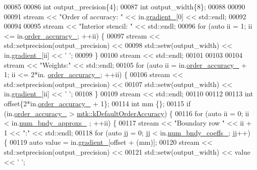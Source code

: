 \begin{DoxyCode}
00085 
00086   \textcolor{keywordtype}{int} output\_precision\{4\};
00087   \textcolor{keywordtype}{int} output\_width\{8\};
00088 
00090 
00091   stream << \textcolor{stringliteral}{"Order of accuracy: "} << in.\hyperlink{classmtk_1_1Grad1D_a024b84b1ea285c0c590eb42d40ff4469}{gradient\_}[0] << std::endl;
00092 
00094 
00095   stream << \textcolor{stringliteral}{"Interior stencil: "} << std::endl;
00096   \textcolor{keywordflow}{for} (\textcolor{keyword}{auto} ii = 1; ii <= in.\hyperlink{classmtk_1_1Grad1D_a545e9c865e5d4716f2684a64f744c78c}{order\_accuracy\_}; ++ii) \{
00097     stream << std::setprecision(output\_precision) <<
00098         std::setw(output\_width) << in.\hyperlink{classmtk_1_1Grad1D_a024b84b1ea285c0c590eb42d40ff4469}{gradient\_}[ii] << \textcolor{charliteral}{' '};
00099   \}
00100   stream << std::endl;
00101 
00103 
00104   stream << \textcolor{stringliteral}{"Weights:"} << std::endl;
00105   \textcolor{keywordflow}{for} (\textcolor{keyword}{auto} ii = in.\hyperlink{classmtk_1_1Grad1D_a545e9c865e5d4716f2684a64f744c78c}{order\_accuracy\_} + 1; ii <= 2*in.
      \hyperlink{classmtk_1_1Grad1D_a545e9c865e5d4716f2684a64f744c78c}{order\_accuracy\_}; ++ii) \{
00106     stream << std::setprecision(output\_precision) <<
00107         std::setw(output\_width) << in.\hyperlink{classmtk_1_1Grad1D_a024b84b1ea285c0c590eb42d40ff4469}{gradient\_}[ii] << \textcolor{charliteral}{' '};
00108   \}
00109   stream << std::endl;
00110 
00112 
00113   \textcolor{keywordtype}{int} offset\{2*in.\hyperlink{classmtk_1_1Grad1D_a545e9c865e5d4716f2684a64f744c78c}{order\_accuracy\_} + 1\};
00114   \textcolor{keywordtype}{int} mm \{\};
00115   \textcolor{keywordflow}{if} (in.\hyperlink{classmtk_1_1Grad1D_a545e9c865e5d4716f2684a64f744c78c}{order\_accuracy\_} > \hyperlink{group__c01-roots_ga0d95560098eb36420511103637b6952f}{mtk::kDefaultOrderAccuracy}) \{
00116     \textcolor{keywordflow}{for} (\textcolor{keyword}{auto} ii = 0; ii < in.\hyperlink{classmtk_1_1Grad1D_abe15c1ffd9dfaba1a65f4f0e096287ce}{num\_bndy\_approxs\_} ; ++ii) \{
00117       stream << \textcolor{stringliteral}{"Boundary row "} << ii + 1 << \textcolor{stringliteral}{":"} << std::endl;
00118       \textcolor{keywordflow}{for} (\textcolor{keyword}{auto} jj = 0; jj < in.\hyperlink{classmtk_1_1Grad1D_a60c560882bc601f9ab1d4cd5331e55ef}{num\_bndy\_coeffs\_}; jj++) \{
00119         \textcolor{keyword}{auto} value = in.\hyperlink{classmtk_1_1Grad1D_a024b84b1ea285c0c590eb42d40ff4469}{gradient\_}[offset + (mm)];
00120         stream << std::setprecision(output\_precision) <<
00121         std::setw(output\_width) << value << \textcolor{charliteral}{' '};

\end{DoxyCode}
